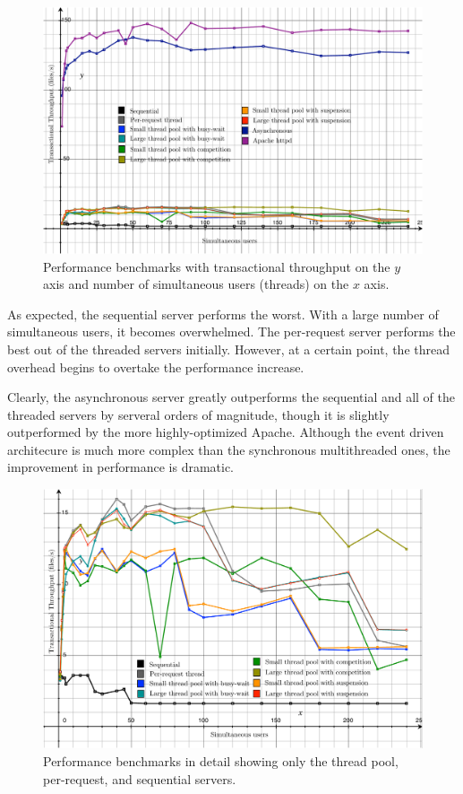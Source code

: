 \documentclass[letterpaper,12pt]{article}
\begin{document}
\begin{figure}[t]
	\centering
	\includegraphics[width=1.0\textwidth]{doc/benchmarks_fig.pdf}
	\caption{Performance benchmarks with transactional throughput on the $y$ axis and number of simultaneous users (threads) on the $x$ axis.}
\end{figure}

As expected, the sequential server performs the worst. With a large number of simultaneous users, it becomes overwhelmed. The per-request server performs the best out of the threaded servers initially. However, at a certain point, the thread overhead begins to overtake the performance increase. 

Clearly, the asynchronous server greatly outperforms the sequential and all of the threaded servers by serveral orders of magnitude, though it is slightly outperformed by the more highly-optimized Apache. Although the event driven architecure is much more complex than the synchronous multithreaded ones, the improvement in performance is dramatic. 

\begin{figure}[t]
	\centering
	\includegraphics[width=1.0\textwidth]{doc/benchmarks_threaded_fig.pdf}
	\caption{Performance benchmarks in detail showing only the thread pool, per-request, and sequential servers.}
\end{figure}
\end{document}
